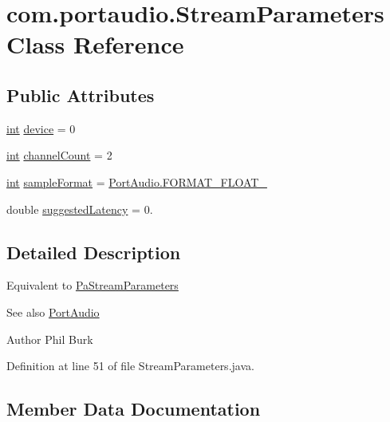 \hypertarget{classcom_1_1portaudio_1_1_stream_parameters}{}\section{com.\+portaudio.\+Stream\+Parameters Class Reference}
\label{classcom_1_1portaudio_1_1_stream_parameters}
\subsection*{Public Attributes}
\begin{DoxyCompactItemize}
\item 
\hyperlink{xmltok_8h_a5a0d4a5641ce434f1d23533f2b2e6653}{int} \hyperlink{classcom_1_1portaudio_1_1_stream_parameters_ae9bf046e666b5cd442c2231724c203b8}{device} = 0
\item 
\hyperlink{xmltok_8h_a5a0d4a5641ce434f1d23533f2b2e6653}{int} \hyperlink{classcom_1_1portaudio_1_1_stream_parameters_ad1a2370679544ee6c2bd6024a6b05af8}{channel\+Count} = 2
\item 
\hyperlink{xmltok_8h_a5a0d4a5641ce434f1d23533f2b2e6653}{int} \hyperlink{classcom_1_1portaudio_1_1_stream_parameters_a621e727a4cf3254fbb7e665d2b7a3489}{sample\+Format} = \hyperlink{classcom_1_1portaudio_1_1_port_audio_a2d96208f8de10d8b5888aeaf5e43fa57}{Port\+Audio.\+F\+O\+R\+M\+A\+T\+\_\+\+F\+L\+O\+A\+T\+\_}
\item 
double \hyperlink{classcom_1_1portaudio_1_1_stream_parameters_a801e70d84a805c96736b3149c8b783c8}{suggested\+Latency} = 0.
\end{DoxyCompactItemize}


\subsection{Detailed Description}
Equivalent to \hyperlink{struct_pa_stream_parameters}{Pa\+Stream\+Parameters} \begin{DoxySeeAlso}{See also}
\hyperlink{classcom_1_1portaudio_1_1_port_audio}{Port\+Audio} 
\end{DoxySeeAlso}
\begin{DoxyAuthor}{Author}
Phil Burk 
\end{DoxyAuthor}


Definition at line 51 of file Stream\+Parameters.\+java.



\subsection{Member Data Documentation}

